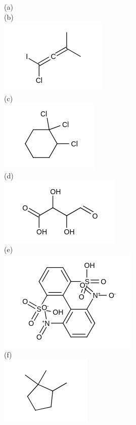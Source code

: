 \documentclass[10pt]{article}
\begin{document}
(a)\\
(b)\\
\includegraphics{smile-de0be520e9942391119ad0d64b813008efa8ed99}\\
(c)\\
\includegraphics{smile-127e214c4f244dc5a46d5bdf4114a723d2724041}\\
(d)\\
\includegraphics{smile-17dc513dcfd5401707214c06fa5fbae93ddcac95}\\
(e)\\
\includegraphics{smile-49436f28cf37754632aa7ca0f96dae6675ac6375}\\
(f)\\
\includegraphics{smile-91f4e9ded8fdcd8f96462b321c562fbbb1bf243f}\\
\end{document}

